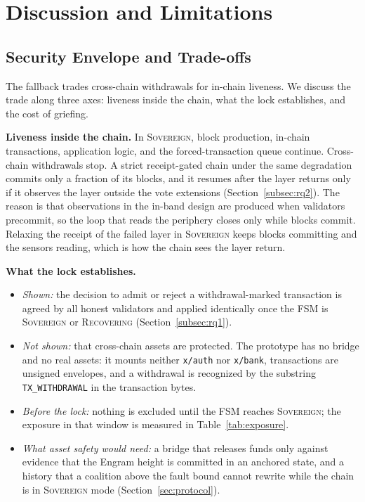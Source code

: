 \section{Discussion and Limitations}
\label{sec:discussion}

\subsection{Security Envelope and Trade-offs}

The fallback trades cross-chain withdrawals for in-chain liveness. We
discuss the trade along three axes: liveness inside the chain, what the
lock establishes, and the cost of griefing.

\textbf{Liveness inside the chain.} In \textsc{Sovereign}, block production,
in-chain transactions, application logic, and the forced-transaction queue
continue. Cross-chain withdrawals stop. A strict receipt-gated chain under the
same degradation commits only a fraction of its blocks, and it resumes after the
layer returns only if it observes the layer outside the vote extensions
(Section~\ref{subsec:rq2}). The reason is that observations in the in-band design
are produced when validators precommit, so the loop that reads the periphery
closes only while blocks commit. Relaxing the receipt of the failed layer in
\textsc{Sovereign} keeps blocks committing and the sensors reading, which is how
the chain sees the layer return.

\textbf{What the lock establishes.}
\begin{itemize}
  \item \emph{Shown:} the decision to admit or reject a withdrawal-marked
  transaction is agreed by all honest validators and applied identically once
  the FSM is \textsc{Sovereign} or \textsc{Recovering} (Section~\ref{subsec:rq1}).
  \item \emph{Not shown:} that cross-chain assets are protected. The prototype
  has no bridge and no real assets: it mounts neither \texttt{x/auth} nor
  \texttt{x/bank}, transactions are unsigned envelopes, and a withdrawal is
  recognized by the substring \texttt{TX\_WITHDRAWAL} in the transaction bytes.
  \item \emph{Before the lock:} nothing is excluded until the FSM reaches
  \textsc{Sovereign}; the exposure in that window is measured in
  Table~\ref{tab:exposure}.
  \item \emph{What asset safety would need:} a bridge that releases funds only
  against evidence that the Engram height is committed in an anchored state, and
  a history that a coalition above the fault bound cannot rewrite while the chain
  is in \textsc{Sovereign} mode (Section~\ref{sec:protocol}).
\end{itemize}

